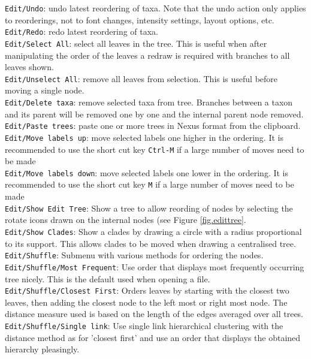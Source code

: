 \documentclass{article}
\begin{document}
\noindent
{\tt Edit/Undo}: undo latest reordering of taxa. Note that the undo action only applies
to reorderings, not to font changes, intensity settings, layout options, etc.\\
{\tt Edit/Redo}: redo latest reordering of taxa.\\
{\tt Edit/Select All}: select all leaves in the tree. This is useful when after manipulating
the order of the leaves a redraw is required with branches to all leaves shown.\\
{\tt Edit/Unselect All}: remove all leaves from selection. This is useful before moving a single
node.\\
{\tt Edit/Delete taxa}: remove selected taxa from tree. Branches between a taxon and its parent
will be removed one by one and the internal parent node removed.\\
{\tt Edit/Paste trees}: paste one or more trees in Nexus format from the clipboard.\\
{\tt Edit/Move labels up}: move selected labels one higher in the ordering. It is recommended to
use the short cut key {\tt Ctrl-M} if a large number of moves need to be made\\
{\tt Edit/Move labels down}: move selected labels one lower in the ordering. It is recommended to
use the short cut key {\tt M} if a large number of moves need to be made\\
{\tt Edit/Show Edit Tree}: Show a tree to allow reording of nodes by selecting the rotate icons
drawn on the internal nodes (see Figure \ref{fig.edittree}.\\
{\tt Edit/Show Clades}: Show a clades by drawing a circle with a radius proportional to its
support. This allows clades to be moved when drawing a centralised tree.\\
{\tt Edit/Shuffle}: Submenu with various methods for ordering the nodes.\\
{\tt Edit/Shuffle/Most Frequent}: Use order that displays most frequently occurring tree nicely. 
This is the default used when opening a file.\\
{\tt Edit/Shuffle/Closest First}: Orders leaves by starting with the closest two leaves, then
adding the closest node to the left most or right most node. The distance measure used is
based on the length of the edges averaged over all trees.\\
{\tt Edit/Shuffle/Single link}: Use single link hierarchical clustering with the distance method
as for 'closest first' and use an order that displays the obtained hierarchy pleasingly.\\
\end{document}
